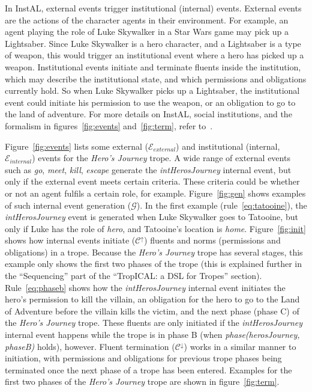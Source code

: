In InstAL, external events trigger institutional (internal) events. External events are the actions of the character agents in their environment. For example, an agent playing the role of Luke Skywalker in a Star Wars game may pick up a Lightsaber. Since Luke Skywalker is a hero character, and a Lightsaber is a type of weapon, this would trigger an institutional event where a hero has picked up a weapon. Institutional events initiate and terminate fluents inside the institution, which may describe the institutional state, and which permissions and obligations currently hold. So when Luke Skywalker picks up a Lightsaber, the institutional event could initiate his permission to use the weapon, or an obligation to go to the land of adventure.
For more details on InstAL, social institutions, and the formalism in figures~\ref{fig:events} and~\ref{fig:term}, refer to~\citep{cliffe2007specifying}.

Figure~\ref{fig:events} lists some external ($\mathcal{E}_{external}$) and institutional (internal, $\mathcal{E}_{internal}$) events for the \emph{Hero's Journey} trope. A wide range of external events such as \emph{go}, \emph{meet}, \emph{kill}, \emph{escape} generate the \emph{intHerosJourney} internal event, but only if the external event meets certain criteria. These criteria could be whether or not an agent fulfils a certain role, for example. Figure~\ref{fig:gen} shows examples of such internal event generation ($\mathcal{G}$). In the first example (rule~\ref{eq:tatooine}), the \emph{intHerosJourney} event is generated when Luke Skywalker goes to Tatooine, but only if Luke has the role of \emph{hero}, and Tatooine's location is \emph{home}.
Figure~\ref{fig:init} shows how internal events initiate ($\mathcal{C^{\uparrow}}$) fluents and norms (permissions and obligations) in a trope. Because the \emph{Hero's Journey} trope has several stages, this example only shows the first two phases of the trope (this is explained further in the ``Sequencing'' part of the ``TropICAL: a DSL for Tropes'' section). Rule~\ref{eq:phaseb} shows how the \emph{intHerosJourney} internal event initiates the hero's permission to kill the villain, an obligation for the hero to go to the Land of Adventure before the villain kills the victim, and the next phase (phase C) of the \emph{Hero's Journey} trope. These fluents are only initiated if the \emph{intHerosJourney} internal event happens while the trope is in phase B (when \emph{phase(herosJourney, phaseB)} holds), however.
Fluent termination ($\mathcal{C^{\downarrow}}$) works in a similar manner to initiation, with permissions and obligations for previous trope phases being terminated once the next phase of a trope has been entered. Examples for the first two phases of the \emph{Hero's Journey} trope are shown in figure~\ref{fig:term}.

